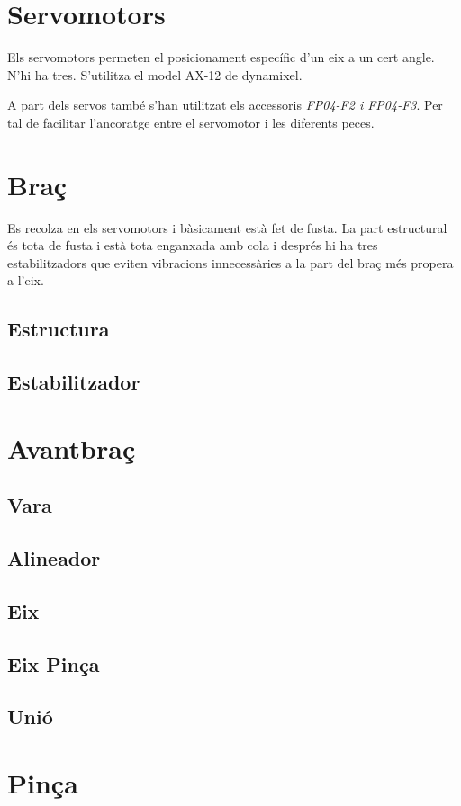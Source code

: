 \documentclass[a4paper, 10pt]{article}
\begin{document}
\newpage
\section{Servomotors}
\begin{flushleft}
Els servomotors permeten el posicionament específic d'un eix a un cert angle. N'hi ha tres. S'utilitza el model AX-12 de dynamixel. 

A part dels servos també s'han utilitzat els accessoris \emph{FP04-F2 i FP04-F3}. Per tal de facilitar l'ancoratge entre el servomotor i les diferents peces.
\end{flushleft}



\newpage
\section{Braç}

Es recolza en els servomotors i bàsicament està fet de fusta. 
La part estructural és tota de fusta i està tota enganxada amb cola i després hi ha tres estabilitzadors que eviten vibracions innecessàries a la part del braç més propera a l'eix. 

\subsection{Estructura}

\subsection{Estabilitzador}

\newpage
\section{Avantbraç}

\subsection{Vara}

\subsection{Alineador}

\subsection{Eix}

\subsection{Eix Pinça}

\subsection{Unió}

\newpage
\section{Pinça}
\end{document}
